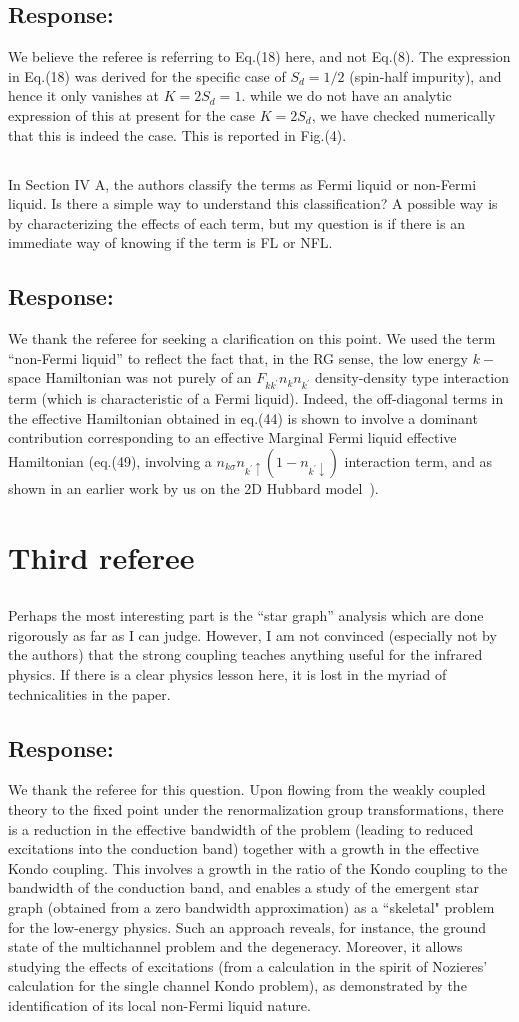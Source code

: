 \documentclass{article}
\newcommand{\response}[1]{{\color{blue}\subsection*{Response:}{#1}}}
\newcommand{\point}[1]{\subsection{}{#1}}
\begin{document}
\response{We believe the referee is referring to Eq.(18) here, and not Eq.(8). The expression in Eq.(18) was derived for the specific case of $S_d = 1/2$ (spin-half impurity), and hence it only vanishes at $K=2S_d=1$. while we do not have an analytic expression of this at present for the case $K=2S_{d}$, we have checked numerically that this is indeed the case. This is reported in Fig.(4).}

\point{
In Section IV A, the authors classify the terms as Fermi liquid or non-Fermi liquid. Is there a simple way to understand this classification? A possible way is by characterizing the effects of each term, but my question is if there is an immediate way of knowing if the term is FL or NFL.}

\response{ We thank the referee for seeking a clarification on this point. We used the term “non-Fermi liquid” to reflect the fact that, in the RG sense, the low energy $k−$space Hamiltonian was not purely of an $F_{kk^\prime} n_k n_{k^\prime}$ density-density type interaction term (which is characteristic of a Fermi liquid). Indeed, the off-diagonal terms in the effective Hamiltonian obtained in eq.(44) is shown to involve a dominant contribution corresponding to an effective Marginal Fermi liquid effective Hamiltonian (eq.(49), involving a $n_{k\sigma} n_{k^{\prime}\uparrow}(1-n_{k^{\prime}\downarrow})$ interaction term, and as shown in an earlier work by us on the 2D Hubbard model~\cite{anirbanmott1,anirbanmott2,anirbanurg1,anirbanurg2}).} 

\section{Third referee}

\point{
Perhaps the most interesting part is the “star graph” analysis which
are done rigorously as far as I can judge. However, I am not convinced
(especially not by the authors) that the strong coupling teaches
anything useful for the infrared physics. If there is a clear physics
lesson here, it is lost in the myriad of technicalities in the paper.
}

\response{We thank the referee for this question. Upon flowing from the weakly coupled theory to the fixed point under the renormalization group transformations, there is a reduction in the effective bandwidth of the problem (leading to reduced excitations into the conduction band) together with a growth in the effective Kondo coupling. This involves a growth in the ratio of the Kondo coupling to the bandwidth of the conduction band, and enables a study of the emergent star graph (obtained from a zero bandwidth approximation) as a ``skeletal" problem for the low-energy physics. Such an approach reveals, for instance, the ground state of the multichannel problem and the degeneracy. Moreover, it allows studying the effects of excitations (from a calculation in the spirit of Nozieres' calculation for the single channel Kondo problem), as demonstrated by the identification of its local non-Fermi liquid nature.
}
\end{document}

